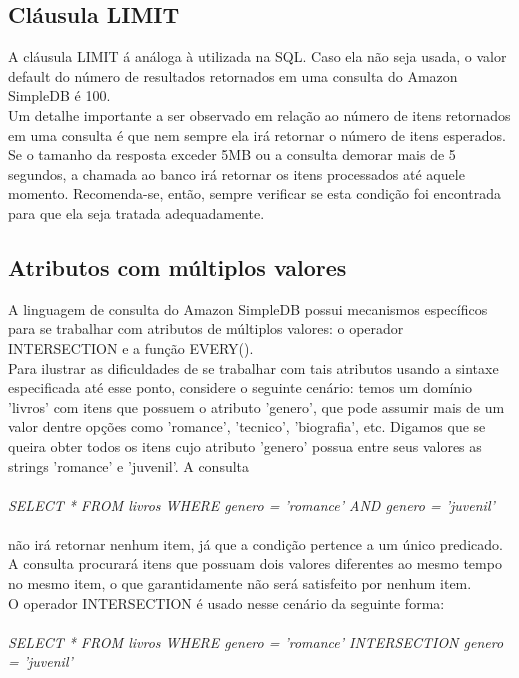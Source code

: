 \subsection{Cláusula LIMIT}
A cláusula LIMIT á análoga à utilizada na SQL. Caso ela não seja usada, o valor default do número de resultados retornados em uma consulta do Amazon SimpleDB é 100.\\
Um detalhe importante a ser observado em relação ao número de itens retornados em uma consulta é que nem sempre ela irá retornar o número de itens esperados. Se o tamanho da resposta exceder 5MB ou a consulta demorar mais de 5 segundos, a chamada ao banco irá retornar os itens processados até aquele momento. Recomenda-se, então, sempre verificar se esta condição foi encontrada para que ela seja tratada adequadamente.

\subsection{Atributos com múltiplos valores}
A linguagem de consulta do Amazon SimpleDB possui mecanismos específicos para se trabalhar com atributos de múltiplos valores: o operador INTERSECTION e a função EVERY().\\
Para ilustrar as dificuldades de se trabalhar com tais atributos usando a sintaxe especificada até esse ponto, considere o seguinte cenário: temos um domínio 'livros' com itens que possuem o atributo 'genero', que pode assumir mais de um valor dentre opções como 'romance', 'tecnico', 'biografia', etc. Digamos que se queira obter todos os itens cujo atributo 'genero' possua entre seus valores as strings 'romance' e 'juvenil'. A consulta \\\\

\textit{SELECT * FROM livros WHERE genero = 'romance' AND genero = 'juvenil'} \\\\

não irá retornar nenhum item, já que a condição pertence a um único predicado. A consulta procurará itens que possuam dois valores diferentes ao mesmo tempo no mesmo item, o que garantidamente não será satisfeito por nenhum item.\\
O operador INTERSECTION é usado nesse cenário da seguinte forma: \\\\

\textit{SELECT * FROM livros WHERE genero  = 'romance' INTERSECTION genero = 'juvenil'} \\\\

